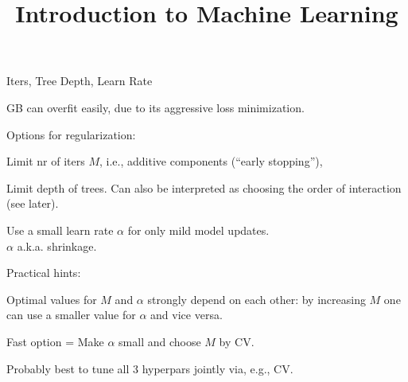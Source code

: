  





\newcommand{\titlefigure}{figure/gbm_sine_title}
\newcommand{\learninggoals}{
  \item Learn about three main regularization options: number of iterations, 
  tree depth and shrinkage
  \item Understand how regularization influences model fit
}

\title{Introduction to Machine Learning}
\date{}






\begin{vbframe}{Iters, Tree Depth, Learn Rate}

GB can overfit easily, due to its aggressive loss minimization.

\begin{blocki}{Options for regularization:}
\item Limit nr of iters $M$, i.e., additive components (\enquote{early stopping}),
\item Limit depth of trees.
    Can also be interpreted as choosing the order of interaction (see later).
\item Use a small learn rate $\alpha$ for only mild model updates. \\
    $\alpha$ a.k.a. shrinkage.
\end{blocki}







\begin{blocki}{Practical hints:}
\item Optimal values for $M$ and $\alpha$ strongly depend on each other:
by increasing $M$ one can use a smaller value for $\alpha$ and vice versa.

\item Fast option = Make $\alpha$ small and choose $M$ by CV. 

\item Probably best to tune all 3 hyperpars jointly via, e.g., CV.
\end{blocki}

\end{vbframe}

